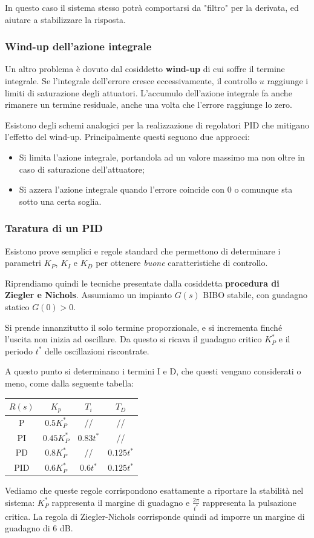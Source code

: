 \documentclass[a4paper,11pt]{article}
\begin{document}
In questo caso il sistema stesso potrà comportarsi da "filtro" per la derivata, ed aiutare a stabilizzare la risposta.

\subsubsection{Wind-up dell'azione integrale}
Un altro problema è dovuto dal cosiddetto \textbf{wind-up} di cui soffre il termine integrale.
Se l'integrale dell'errore cresce eccessivamente, il controllo $u$ raggiunge i limiti di saturazione degli attuatori.
L'accumulo dell'azione integrale fa anche rimanere un termine residuale, anche una volta che l'errore raggiunge lo zero.

Esistono degli schemi analogici per la realizzazione di regolatori PID che mitigano l'effetto del wind-up.
Principalmente questi seguono due approcci:
\begin{itemize}
	\item Si limita l'azione integrale, portandola ad un valore massimo ma non oltre in caso di saturazione dell'attuatore;
	\item Si azzera l'azione integrale quando l'errore coincide con 0 o comunque sta sotto una certa soglia.
\end{itemize}

\subsubsection{Taratura di un PID}
Esistono prove semplici e regole standard che permettono di determinare i parametri $K_P$, $K_I$ e $K_D$ per ottenere \textit{buone} caratteristiche di controllo.

Riprendiamo quindi le tecniche presentate dalla cosiddetta \textbf{procedura di Ziegler e Nichols}.
Assumiamo un impianto $G(s)$ BIBO stabile, con guadagno statico $G(0) > 0$.

Si prende innanzitutto il solo termine proporzionale, e si incrementa finché l'uscita non inizia ad oscillare.
		Da questo si ricava il guadagno critico $K_P^*$ e il periodo $t^*$ delle oscillazioni riscontrate.

A questo punto si determinano i termini I e D, che questi vengano considerati o meno, come dalla seguente tabella:

\begin{table}[h!]
	\center {}
	\begin{tabular} { c || c | c | c }
		$R(s)$ & $K_p$ & $T_i$ & $T_D$ \\
		\hline
		P & $0.5 K_P^*$ & // & // \\
		PI & $0.45 K_P^*$ & $0.83 t^*$ & // \\
		PD & $0.8 K_P^*$ & // & $0.125 t^*$ \\
		PID & $0.6 K_P^*$ & $0.6 t^*$ & $0.125 t^*$ \\
	\end{tabular}
\end{table}

Vediamo che queste regole corrispondono esattamente a riportare la stabilità nel sistema: $K_P^*$ rappresenta il margine di guadagno e $\frac{2 \pi}{t^*}$ rappresenta la pulsazione critica.
La regola di Ziegler-Nichols corrisponde quindi ad imporre un margine di guadagno di 6 dB.
\end{document}
